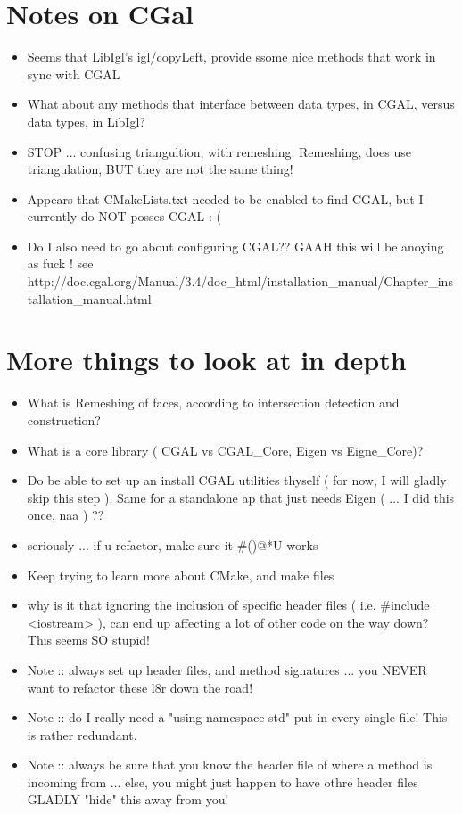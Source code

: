 \documentclass{article}
\begin{document}
\section{Notes on CGal}
\begin{itemize}
	\item Seems that LibIgl's igl/copyLeft, provide ssome nice methods that work in sync with CGAL
	\item What about any methods that interface between data types, in CGAL, versus data types, in LibIgl? 
	\item STOP ... confusing triangultion, with remeshing. Remeshing, does use triangulation, BUT they are not the same thing! 
	\item Appears that CMakeLists.txt needed to be enabled to find CGAL, but I currently do NOT posses CGAL :-(
	\item Do I also need to go about configuring CGAL?? GAAH this will be anoying as fuck !
		see http://doc.cgal.org/Manual/3.4/doc_html/installation_manual/Chapter_installation_manual.html
\end{itemize}

\section{More things to look at in depth}
\begin{itemize}
	\item What is Remeshing of faces, according to intersection detection and construction?
	\item What is a core library ( CGAL vs CGAL_Core, Eigen vs Eigne_Core)?
	\item Do be able to set up an install CGAL utilities thyself ( for now, I will gladly skip this step ). Same for a standalone ap that just needs Eigen ( ... I did this once, naa ) ?? 
	\item seriously ... if u refactor, make sure it #()@*U works
	\item Keep trying to learn more about CMake, and make files
	\item why is it that ignoring the inclusion of specific header files ( i.e. #include <iostream> ), can end up affecting a lot of other code on the way down? This seems SO stupid!
	\item Note :: always set up header files, and method signatures ... you NEVER want to refactor these l8r down the road!
	\item Note :: do I really need a "using namespace std" put in every single file! This is rather redundant.
	\item Note :: always be sure that you know the header file of where a method is incoming from ... else, you might just happen to have othre header files GLADLY "hide" this away from you! 
\end{itemize}
\end{document}

